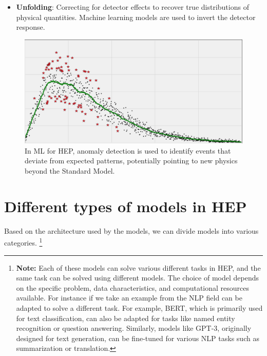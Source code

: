 \documentclass[letterpaper,12pt]{article}
\begin{document}
\begin{spacing}{1.125}
\begin{itemize}
\item \textbf{Unfolding}: Correcting for detector effects to recover true distributions of physical quantities. Machine learning models are used to invert the detector response.
\end{itemize}
\vspace{1cm}
\begin{figure}[H]
\begin{minipage}{0.55\textwidth}
\includegraphics[width=\textwidth]{anomalies.png}
\end{minipage}
\hfill
\begin{minipage}{0.4\textwidth}
\caption{In ML for HEP, anomaly detection is used to identify events that deviate from expected patterns, potentially pointing to new physics beyond the Standard Model.}
\end{minipage}
\end{figure}

\section{Different types of models in HEP}


Based on the architecture used by the models, we can divide models into various categories.
\footnote{
\textbf{Note: } Each of these models can solve various different tasks in HEP, and the same task can be solved using different models. The choice of model depends on the specific problem, data characteristics, and computational resources available.
 For instance if we take an example from the NLP field can be adapted to solve a different task. For example, BERT, which is primarily used for text classification, can also be adapted for tasks like named entity recognition or question answering. Similarly, models like GPT-3, originally designed for text generation, can be fine-tuned for various NLP tasks such as summarization or translation.
}


\end{spacing}
\end{document}
